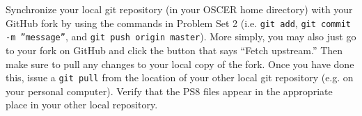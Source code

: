 \documentclass[12pt,english]{exam}
\begin{document}
\begin{questions}
\question Synchronize your local git repository (in your OSCER home directory) with your GitHub fork by using the commands in Problem Set 2 (i.e. \texttt{git add}, \texttt{git commit -m ''message''}, and \texttt{git push origin master}). More simply, you may also just go to your fork on GitHub and click the button that says ``Fetch upstream.'' Then make sure to pull any changes to your local copy of the fork. Once you have done this, issue a \texttt{git pull} from the location of your other local git repository (e.g. on your personal computer). Verify that the PS8 files appear in the appropriate place in your other local repository.

\end{questions}
\end{document}
